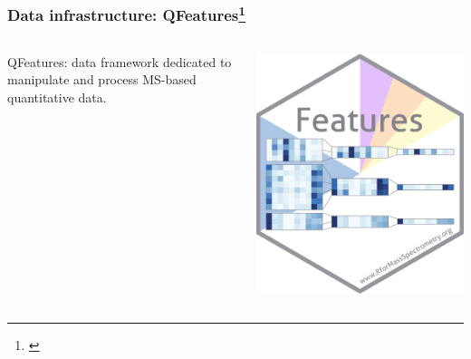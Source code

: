 \documentclass{beamer}
\newcommand{\hcode}[2][lgray]{{\ttfamily\color{vdgray}\colorbox{#1}{#2}}}
\newcommand{\frametitlesection}[1]{\frametitle{\centering #1 \footnotesize \hspace{0pt plus 1 filll} \insertsection}}
\begin{document}
\begin{frame}
    \frametitlesection{Data infrastructure: QFeatures\footnote{\citet{QFeatures}}}
    
    \centering
    \begin{columns}
        \begin{column}{0.8\textwidth}
            \hcode{QFeatures}: data framework dedicated to manipulate and process 
            MS-based quantitative data. 
        \end{column}
        \begin{column}{0.2\textwidth}
            \includegraphics[width=\linewidth]{figs/sticker_QFeatures.png}
        \end{column}
        
    \end{columns}
    
    \bigskip
    

\end{frame}
\end{document}
